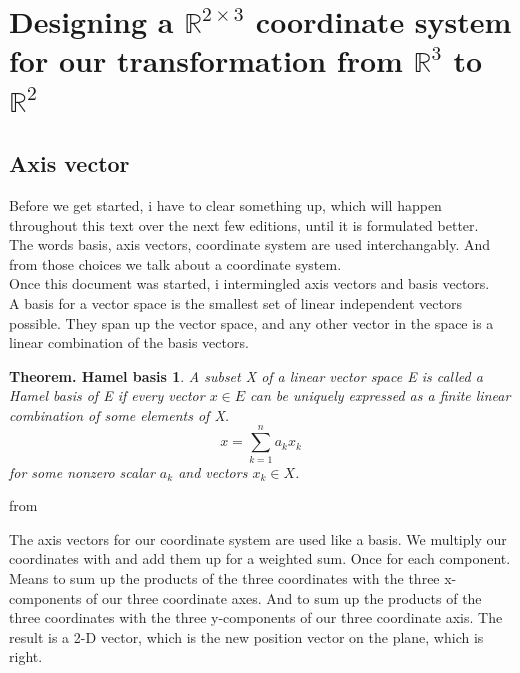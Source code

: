 \documentclass[a4paper]{article}
\begin{document}
\section{Designing a $\mathbb{R}^{2\times{3}}$ coordinate system for our transformation from $\mathbb{R}^{3}$ to $\mathbb{R}^{2}$}

\subsection{Axis vector}

Before we get started, i have to clear something up, which will happen throughout this text over the next few editions, until it is formulated better.\\

The words basis, axis vectors, coordinate system are used interchangably. And from those choices we talk about a coordinate system.\\

Once this document was started, i intermingled axis vectors and basis vectors.\\

A basis for a vector space is the smallest set of linear independent vectors possible. They span up the vector space, and any other vector in the space is a linear combination of the basis vectors.\\

\newtheorem{Vectorbasis}{Theorem. Hamel basis}
\begin{Vectorbasis}
A subset X of a linear vector space E is called a Hamel basis of E if every vector $x \in E$ can be uniquely expressed as a finite linear combination of some elements of X.
\begin{displaymath}
x=\sum_{k=1}^{n}a_{k}x_{k}
\end{displaymath}
for some nonzero scalar $a_{k}$ and vectors $x_{k} \in X$.
\end{Vectorbasis}
from \cite{Vershynin1}


The axis vectors for our coordinate system are used like a basis. We multiply our coordinates with and add them up for a weighted sum. Once for each component. Means to sum up the products of the three coordinates with the three x-components of our three coordinate axes. And to sum up the products of the three coordinates with the three y-components of our three coordinate axis. The result is a 2-D vector, which is the new position vector on the plane, which is right.\\
\end{document}
